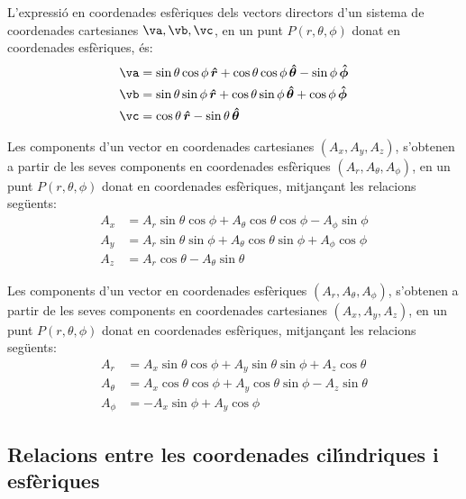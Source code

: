 \documentclass[catalan,a4paper,twoside,11pt]{article}
\begin{document}
L'expressi\'{o} en coordenades esf\`{e}riques dels vectors directors d'un sistema de coordenades  cartesianes $\va,\vb,\vc$, en un punt $P(r,\theta,\phi)$ donat en coordenades esf\`{e}riques, \'{e}s:
\begin{subequations}\begin{align}
    \va &=\sin\theta\cos\phi\,\boldsymbol{\hat{r}}+
    \cos\theta\cos\phi\,\boldsymbol{\hat{\theta}}-\sin\phi\,\boldsymbol{\hat{\phi}}\\
    \vb &=\sin\theta\sin\phi\,\boldsymbol{\hat{r}}+
    \cos\theta\sin\phi\,\boldsymbol{\hat{\theta}}+\cos\phi\,\boldsymbol{\hat{\phi}}\\
    \vc &=\cos\theta\,\boldsymbol{\hat{r}}-\sin\theta\,\boldsymbol{\hat{\theta}}
\end{align}\end{subequations}

Les components d'un vector en coordenades cartesianes $(A_x, A_y, A_z)$, s'obtenen a partir de les seves components en coordenades esf\`{e}riques $(A_r, A_\theta, A_\phi)$, en un punt $P(r,\theta,\phi)$ donat en coordenades esf\`{e}riques, mitjan\c{c}ant les relacions seg\"{u}ents:
\begin{subequations}\begin{align}
    A_x &= A_r\sin\theta\cos\phi+A_\theta\cos\theta\cos\phi-A_\phi\sin\phi \\
    A_y &= A_r\sin\theta\sin\phi+A_\theta\cos\theta\sin\phi+A_\phi\cos\phi\\
    A_z &= A_r\cos\theta-A_\theta\sin\theta
\end{align}\end{subequations}

Les components d'un vector en coordenades esf\`{e}riques $(A_r, A_\theta, A_\phi)$, s'obtenen a partir de les seves components en coordenades cartesianes $(A_x, A_y, A_z)$, en un punt $P(r,\theta,\phi)$ donat en coordenades esf\`{e}riques, mitjan\c{c}ant les relacions seg\"{u}ents:
\begin{subequations}\begin{align}
    A_r &=  A_x\sin\theta\cos\phi+A_y\sin\theta\sin\phi+A_z\cos\theta\\
    A_\theta &=  A_x\cos\theta\cos\phi+A_y\cos\theta\sin\phi-A_z\sin\theta\\
    A_\phi &= -A_x\sin\phi+A_y\cos\phi
\end{align}\end{subequations}


\subsection{Relacions entre les coordenades cil\'{\i}ndriques i
esf\`{e}riques}
\end{document}
